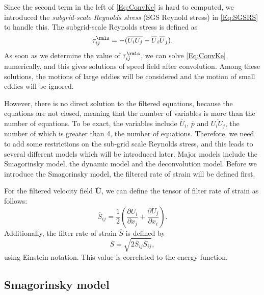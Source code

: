 \documentclass[english, nochinese]{pkupaper}
\begin{document}
Since the second term in the left of \eqref{Eq:ConvKe} is hard to computed, we introduced the \emph{subgrid-scale Reynolds stress} (SGS Reynold stress) in \eqref{Eq:SGSRS} to handle this. The subgrid-scale Reynolds stress is defined as
\begin{equation}\label{Eq:SGSRS}
\tau_{ij}^{\rmls} = -(\overline{U_iU_j}-\overline{U}_i\overline{U}_j).
\end{equation}
As soon as we determine the value of $\tau_{ij}^{\rmls}$, we can solve \eqref{Eq:ConvKe} numerically, and this gives solutions of speed field after convolution. Among these solutions, the motions of large eddies will be considered and the motion of small eddies will be ignored.

However, there is no direct solution to the filtered equations, because the equations are not closed, meaning that the number of variables is more than the number of equations. To be exact, the variables include $\overline{U}_i$, $\overline{p}$ and $\overline{U_iU_j}$, the number of which is greater than 4, the number of equations. Therefore, we need to add some restrictions on the sub-grid scale Reynolds stress, and this leads to several different models which will be introduced later. Major models include the Smagorinsky model, the dynamic model and the deconvolution model. Before we introduce the Smagorinsky model, the filtered rate of strain will be defined first.

For the filtered velocity field $\overline{\mathbf{U}}$, we can define the tensor of filter rate of strain as follows:
\begin{equation}
\overline{S}_{ij} = \frac{1}{2}\left(\frac{\partial\overline{U}_i}{\partial x_j} + \frac{\partial\overline{U}_j}{\partial x_i}\right).
\end{equation}
Additionally, the filter rate of strain $\overline{S}$ is defined by
\begin{equation}
\overline{S} = \sqrt{2\overline{S}_{ij}\overline{S}_{ij}},
\end{equation}
using Einstein notation. This value is correlated to the energy function.

\subsection{Smagorinsky model}
\end{document}
